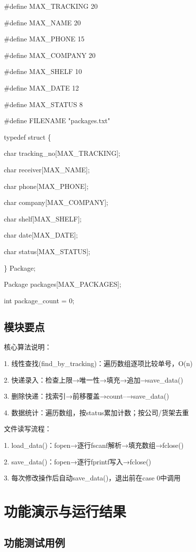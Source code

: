 \#define MAX\_TRACKING  20

\#define MAX\_NAME      20

\#define MAX\_PHONE     15

\#define MAX\_COMPANY   20

\#define MAX\_SHELF     10

\#define MAX\_DATE      12

\#define MAX\_STATUS    8

\#define FILENAME      "packages.txt"

typedef struct \{

char tracking\_no[MAX\_TRACKING];

char receiver[MAX\_NAME];

char phone[MAX\_PHONE];

char company[MAX\_COMPANY];

char shelf[MAX\_SHELF];

char date[MAX\_DATE];

char status[MAX\_STATUS];

\} Package;

Package packages[MAX\_PACKAGES];

int package\_count = 0;

\subsection{模块要点}
核心算法说明：

1. 线性查找(find\_by\_tracking)：遍历数组逐项比较单号，O(n)

2. 快递录入：检查上限→唯一性→填充→追加→save\_data()

3. 删除快递：找索引→前移覆盖→count--→save\_data()

4. 数据统计：遍历数组，按status累加计数；按公司/货架去重

文件读写流程：

1. load\_data()：fopen→逐行fscanf解析→填充数组→fclose()

2. save\_data()：fopen→逐行fprintf写入→fclose()

3. 每次修改操作后自动save\_data()，退出前在case 0中调用

\section{功能演示与运行结果}
\subsection{功能测试用例}
